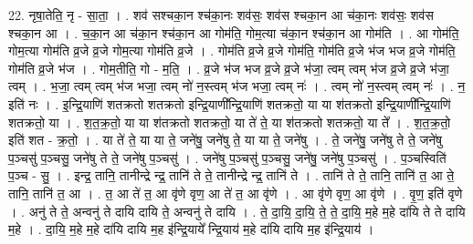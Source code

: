 \documentclass[17pt]{extarticle}
\begin{document}
22. नृषा॒तेति॒ नृ - सा॒ता॒ । . शव॑ सश्चका॒न श्च॑का॒नः शव॑सः॒ शव॑स श्चका॒न आ च॑का॒नः शव॑सः॒ शव॑स श्चका॒न आ । . च॒का॒न आ च॑का॒न श्च॑का॒न आ गोम॑ति॒ गोम॒त्या च॑का॒न श्च॑का॒न आ गोम॑ति । . आ गोम॑ति॒ गोम॒त्या गोम॑ति व्र॒जे व्र॒जे गोम॒त्या गोम॑ति व्र॒जे । . गोम॑ति व्र॒जे व्र॒जे गोम॑ति॒ गोम॑ति व्र॒जे भ॑ज भज व्र॒जे गोम॑ति॒ गोम॑ति व्र॒जे भ॑ज । . गोम॒तीति॒ गो - म॒ति॒ । . व्र॒जे भ॑ज भज व्र॒जे व्र॒जे भ॑जा॒ त्वम् त्वम् भ॑ज व्र॒जे व्र॒जे भ॑जा॒ त्वम् । . भ॒जा॒ त्वम् त्वम् भ॑ज भजा॒ त्वम् नो॑ न॒स्त्वम् भ॑ज भजा॒ त्वम् नः॑ । . त्वम् नो॑ न॒स्त्वम् त्वम् नः॑ । . न॒ इति॑ नः । . इ॒न्द्रि॒याणि॑ शतक्रतो शतक्रतो इन्द्रि॒याणी᳚न्द्रि॒याणि॑ शतक्रतो॒ या या श॑तक्रतो इन्द्रि॒याणी᳚न्द्रि॒याणि॑ शतक्रतो॒ या । . श॒त॒क्र॒तो॒ या या श॑तक्रतो शतक्रतो॒ या ते॑ ते॒ या श॑तक्रतो शतक्रतो॒ या ते᳚ । . श॒त॒क्र॒तो॒ इति॑ शत - क्र॒तो॒ । . या ते॑ ते॒ या या ते॒ जने॑षु॒ जने॑षु ते॒ या या ते॒ जने॑षु । . ते॒ जने॑षु॒ जने॑षु ते ते॒ जने॑षु प॒ञ्चसु॑ प॒ञ्चसु॒ जने॑षु ते ते॒ जने॑षु प॒ञ्चसु॑ । . जने॑षु प॒ञ्चसु॑ प॒ञ्चसु॒ जने॑षु॒ जने॑षु प॒ञ्चसु॑ । . प॒ञ्चस्विति॑ प॒ञ्च - सु॒ । . इन्द्र॒ तानि॒ तानीन्द्रे न्द्र॒ तानि॑ ते ते॒ तानीन्द्रे न्द्र॒ तानि॑ ते । . तानि॑ ते ते॒ तानि॒ तानि॑ त॒ आ ते॒ तानि॒ तानि॑ त॒ आ । . त॒ आ ते॑ त॒ आ वृ॑णे वृण॒ आ ते॑ त॒ आ वृ॑णे । . आ वृ॑णे वृण॒ आ वृ॑णे । . वृ॒ण॒ इति॑ वृणे । . अनु॑ ते ते॒ अन्वनु॑ ते दायि दायि ते॒ अन्वनु॑ ते दायि । . ते॒ दा॒यि॒ दा॒यि॒ ते॒ ते॒ दा॒यि॒ म॒हे म॒हे दा॑यि ते ते दायि म॒हे । . दा॒यि॒ म॒हे म॒हे दा॑यि दायि म॒ह इ॑न्द्रि॒याये᳚ न्द्रि॒याय॑ म॒हे दा॑यि दायि म॒ह इ॑न्द्रि॒याय॑ । \newline
\end{document}
